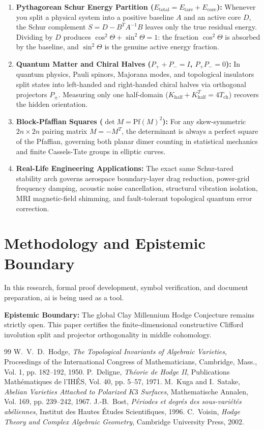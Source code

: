 \documentclass[11pt,a4paper]{article}
\theoremstyle{definition}
\begin{document}
\begin{enumerate}
  \item \textbf{Pythagorean Schur Energy Partition ($E_{\mathrm{total}} = E_{\mathrm{tare}} + E_{\mathrm{core}}$):} Whenever you split a physical system into a positive baseline $A$ and an active core $D$, the Schur complement $S = D - B^T A^{-1} B$ leaves only the true residual energy. Dividing by $D$ produces $\cos^2\Theta + \sin^2\Theta = 1$: the fraction $\cos^2\Theta$ is absorbed by the baseline, and $\sin^2\Theta$ is the genuine active energy fraction.
  \item \textbf{Quantum Matter and Chiral Halves ($P_+ + P_- = I$, $P_+ P_- = 0$):} In quantum physics, Pauli spinors, Majorana modes, and topological insulators split states into left-handed and right-handed chiral halves via orthogonal projectors $P_\pm$. Measuring only one half-domain ($K_{\mathrm{half}} + K_{\mathrm{half}}^T = 4 T_{\mathrm{ch}}$) recovers the hidden orientation.
  \item \textbf{Block-Pfaffian Squares ($\det M = \mathrm{Pf}(M)^2$):} For any skew-symmetric $2n \times 2n$ pairing matrix $M = -M^T$, the determinant is always a perfect square of the Pfaffian, governing both planar dimer counting in statistical mechanics and finite Cassels-Tate groups in elliptic curves.
  \item \textbf{Real-Life Engineering Applications:} The exact same Schur-tared stability arch governs aerospace boundary-layer drag reduction, power-grid frequency damping, acoustic noise cancellation, structural vibration isolation, MRI magnetic-field shimming, and fault-tolerant topological quantum error correction.
\end{enumerate}

\section{Methodology and Epistemic Boundary}

In this research, formal proof development, symbol verification, and document preparation, ai is being used as a tool. 

\textbf{Epistemic Boundary:} The global Clay Millennium Hodge Conjecture remains strictly open. This paper certifies the finite-dimensional constructive Clifford involution split and projector orthogonality in middle cohomology.


\begin{thebibliography}{99}
 W.~V.~D.~Hodge, \emph{The Topological Invariants of Algebraic Varieties}, Proceedings of the International Congress of Mathematicians, Cambridge, Mass., Vol. 1, pp. 182--192, 1950.
 P.~Deligne, \emph{Th\'eorie de Hodge II}, Publications Math\'ematiques de l'IH\'ES, Vol. 40, pp. 5--57, 1971.
 M.~Kuga and I.~Satake, \emph{Abelian Varieties Attached to Polarized $K3$ Surfaces}, Mathematische Annalen, Vol. 169, pp. 239--242, 1967.
 J.-B.~Bost, \emph{P\'eriodes et degr\'es des sous-vari\'et\'es ab\'eliennes}, Institut des Hautes \'Etudes Scientifiques, 1996.
 C.~Voisin, \emph{Hodge Theory and Complex Algebraic Geometry}, Cambridge University Press, 2002.
\end{thebibliography}
\end{document}

